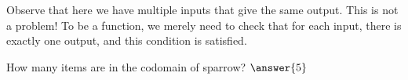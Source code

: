 \documentclass{ximera}
\begin{document}
\begin{exercise}
\begin{image}
\end{image}
Observe that here we have multiple inputs that give
the same output.  This is not a problem! To be a function, we
merely need to check that for each input, there is exactly one output,
and this condition is satisfied.
\end{exercise}











\begin{exercise}
How many items are in the codomain of sparrow? $\answer{5}$
\end{exercise}
\end{document}
